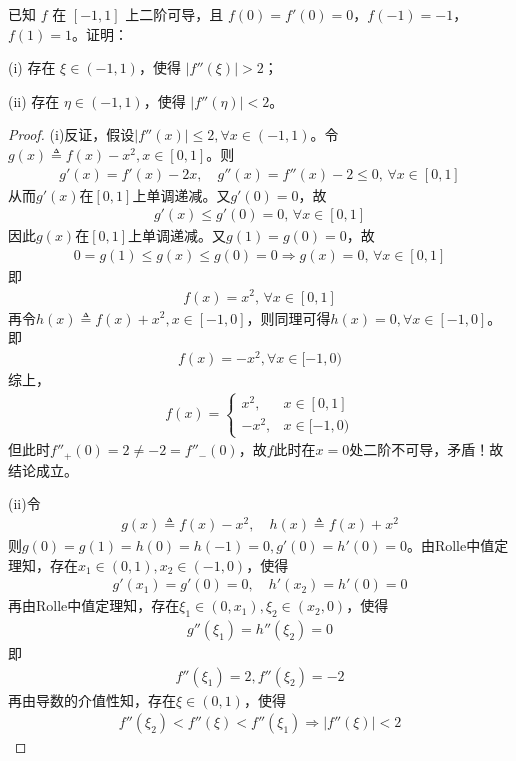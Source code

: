 \documentclass[../../main.tex]{subfiles}%
\begin{document}
\begin{example}
已知 $f$ 在 $[-1,1]$ 上二阶可导，且 $f(0) = f'(0) = 0$，$f(-1) = -1$，$f(1) = 1$。证明：

(i) 存在 $\xi \in (-1,1)$，使得 $|f''(\xi)| > 2$；

(ii) 存在 $\eta \in (-1,1)$，使得 $|f''(\eta)| < 2$。
\end{example}
\begin{proof}

(i)反证，假设$| f''(x) | \leqslant 2, \forall x \in (-1,1)$。令$g(x) \triangleq f(x) - x^2, x \in [0,1]$。则
\begin{align*}
g'(x) = f'(x) - 2x, \quad g''(x) = f''(x) - 2 \leqslant 0, \, \forall x \in [0,1]
\end{align*}
从而$g'(x)$在$[0,1]$上单调递减。又$g'(0) = 0$，故
\begin{align*}
g'(x) \leqslant g'(0) = 0, \, \forall x \in [0,1]
\end{align*}
因此$g(x)$在$[0,1]$上单调递减。又$g(1) = g(0) = 0$，故
\begin{align*}
0 = g(1) \leqslant g(x) \leqslant g(0) = 0 \Longrightarrow g(x) = 0, \, \forall x \in [0,1]
\end{align*}
即
\begin{align*}
f(x) = x^2, \, \forall x \in [0,1]
\end{align*}
再令$h(x) \triangleq f(x) + x^2, x \in [-1,0]$，则同理可得$h(x) = 0, \forall x \in [-1,0]$。即
\begin{align*}
f(x) = -x^2, \forall x \in [-1,0)
\end{align*}
综上，
\begin{align*}
f(x) = \begin{cases} 
x^2, & x \in [0,1] \\
-x^2, & x \in [-1,0)
\end{cases}
\end{align*}
但此时$f''_+(0) = 2 \ne -2 = f''_-(0)$，故$f$此时在$x=0$处二阶不可导，矛盾！故结论成立。

(ii)令
\begin{align*}
g(x) \triangleq f(x) - x^2, \quad h(x) \triangleq f(x) + x^2
\end{align*}
则$g(0) = g(1) = h(0) = h(-1) = 0, g'(0) = h'(0) = 0$。由Rolle中值定理知，存在$x_1 \in (0,1), x_2 \in (-1,0)$，使得
\begin{align*}
g'(x_1) = g'(0) = 0, \quad h'(x_2) = h'(0) = 0
\end{align*}
再由Rolle中值定理知，存在$\xi_1 \in (0, x_1), \xi_2 \in (x_2, 0)$，使得
\begin{align*}
g''(\xi_1) = h''(\xi_2) = 0
\end{align*}
即
\begin{align*}
f''(\xi_1) = 2, f''(\xi_2) = -2
\end{align*}
再由导数的介值性知，存在$\xi \in (0,1)$，使得
\begin{align*}
f''(\xi_2) < f''(\xi) < f''(\xi_1) \Longrightarrow | f''(\xi) | < 2
\end{align*}

\end{proof}
\end{document}
